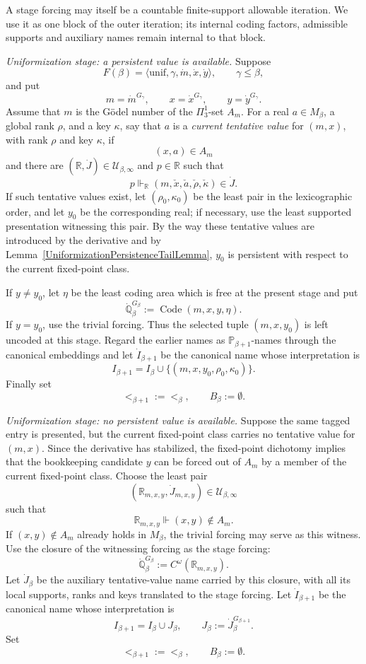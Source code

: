 \documentclass[a4paper,11pt]{article}
\newcommand{\forceP}{\mathbb{P}}
\newcommand{\forceQ}{\mathbb{Q}}
\newcommand{\forceR}{\mathbb{R}}
\begin{document}
A stage forcing may itself be a countable finite-support allowable iteration. We use it as one block of the outer iteration; its internal coding factors, admissible supports and auxiliary names remain internal to that block.

\medskip
\noindent
\emph{Uniformization stage: a persistent value is available.}
Suppose
\[
F(\beta)=\langle\mathrm{unif},\gamma,\dot m,\dot x,\dot y\rangle,
\qquad \gamma\leq\beta,
\]
and put
\[
m=\dot m^{G_\gamma},\qquad
x=\dot x^{G_\gamma},\qquad
y=\dot y^{G_\gamma}.
\]
Assume that $m$ is the G\"odel number of the $\Pi^1_3$-set $A_m$. For a real $a\in M_\beta$, a global rank $\rho$, and a key $\kappa$, say that $a$ is a \emph{current tentative value} for $(m,x)$, with rank $\rho$ and key $\kappa$, if
\[
(x,a)\in A_m
\]
and there are $(\forceR,\dot J)\in\mathcal U_{\beta,\infty}$ and $p\in\forceR$ such that
\[
p\Vdash_{\forceR}(m,\check x,\check a,\check\rho,\check\kappa)\in\dot J.
\]
If such tentative values exist, let $(\rho_0,\kappa_0)$ be the least pair in the lexicographic order, and let $y_0$ be the corresponding real; if necessary, use the least supported presentation witnessing this pair. By the way these tentative values are introduced by the derivative and by Lemma~\ref{UniformizationPersistenceTailLemma}, $y_0$ is persistent with respect to the current fixed-point class.

If $y\neq y_0$, let $\eta$ be the least coding area which is free at the present stage and put
\[
\dot{\forceQ}_\beta^{G_\beta}
:=\operatorname{Code}(m,x,y,\eta).
\]
If $y=y_0$, use the trivial forcing. Thus the selected tuple $(m,x,y_0)$ is left uncoded at this stage. Regard the earlier names as $\forceP_{\beta+1}$-names through the canonical embeddings and let $\dot I_{\beta+1}$ be the canonical name whose interpretation is
\[
I_{\beta+1}
=I_\beta\cup\{(m,x,y_0,\rho_0,\kappa_0)\}.
\]
Finally set
\[
<_{\beta+1}:=<_\beta,
\qquad
B_\beta:=\emptyset.
\]

\medskip
\noindent
\emph{Uniformization stage: no persistent value is available.}
Suppose the same tagged entry is presented, but the current fixed-point class carries no tentative value for $(m,x)$. Since the derivative has stabilized, the fixed-point dichotomy implies that the bookkeeping candidate $y$ can be forced out of $A_m$ by a member of the current fixed-point class. Choose the least pair
\[
(\forceR_{m,x,y},\dot J_{m,x,y})\in\mathcal U_{\beta,\infty}
\]
such that
\[
\forceR_{m,x,y}\Vdash(x,y)\notin A_m.
\]
If $(x,y)\notin A_m$ already holds in $M_\beta$, the trivial forcing may serve as this witness. Use the closure of the witnessing forcing as the stage forcing:
\[
\dot{\forceQ}_\beta^{G_\beta}
:=C^\omega(\forceR_{m,x,y}).
\]
Let $\dot J_\beta$ be the auxiliary tentative-value name carried by this closure, with all its local supports, ranks and keys translated to the stage forcing. Let $\dot I_{\beta+1}$ be the canonical name whose interpretation is
\[
I_{\beta+1}=I_\beta\cup J_\beta,
\qquad
J_\beta:=\dot J_\beta^{G_{\beta+1}}.
\]
Set
\[
<_{\beta+1}:=<_\beta,
\qquad
B_\beta:=\emptyset.
\]
\end{document}
